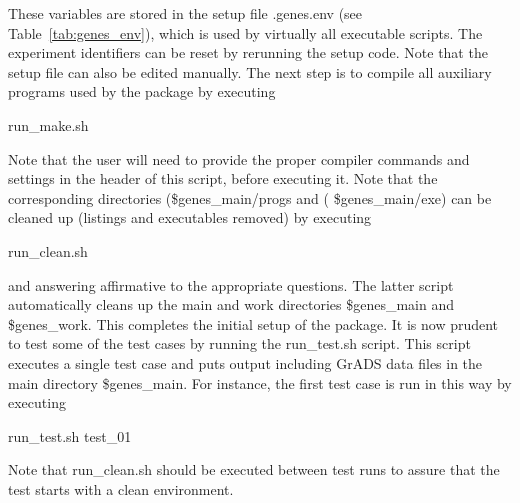 \documentclass[12pt]{article}
\newcommand{\file}{\sf}
\begin{document}
\noindent
These variables are stored in the setup file {\file .genes.env} (see
Table~\ref{tab:genes_env}), which is used by virtually all executable scripts.
The experiment identifiers can be reset by rerunning the setup code.  Note
that the setup file can also be edited manually. The next step is to compile
all auxiliary programs used by the package by executing
\begin{center}
{\file run\_make.sh}
\end{center}
\noindent
Note that the user will need to provide the proper compiler commands and
settings in the header of this script, before executing it. Note that the
corresponding directories ({\file \$genes\_main/progs} and ({\file
\$genes\_main/exe}) can be cleaned up (listings and executables removed) by
executing
\begin{center}
{\file run\_clean.sh}
\end{center}
\noindent
and answering affirmative to the appropriate questions. The latter script
automatically cleans up the main and work directories {\file \$genes\_main}
and {\file \$genes\_work}. This completes the initial setup of the package. It
is now prudent to test some of the test cases by running the {\file
run\_test.sh} script. This script executes a single test case and puts output
including GrADS data files in the main directory {\file \$genes\_main}. For
instance, the first test case is run in this way by executing
\begin{center}
{\file run\_test.sh test\_01}
\end{center}
\noindent
Note that {\file run\_clean.sh} should be executed between test runs to assure
that the test starts with a clean environment.
\end{document}
